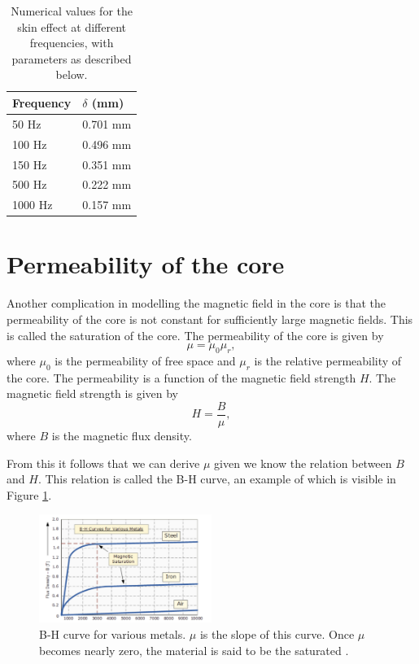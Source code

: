 \begin{table}
    \centering
    \begin{tabular}{l|l}
        Frequency & $\delta$ (mm) \\
        \hline
        50 Hz   & 0.701 mm \\
        100 Hz  & 0.496 mm \\
        150 Hz  & 0.351 mm \\
        500 Hz  & 0.222 mm \\
        1000 Hz & 0.157 mm \\
    \end{tabular}
    \caption{Numerical values for the skin effect at different frequencies, with parameters as described below.}
    \label{tab:skin_effect}
\end{table}


\section{Permeability of the core}
Another complication in modelling the magnetic field in the core is that the permeability of the core is not constant for sufficiently large magnetic fields.
This is called the saturation of the core. The permeability of the core is given by
\begin{equation}
    \mu = \mu_0 \mu_r,
\end{equation}
where $\mu_0$ is the permeability of free space and $\mu_r$ is the relative permeability of the core. The permeability is a function of the magnetic field strength $H$.
The magnetic field strength is given by
\begin{equation}
    H = \frac{B}{\mu},
\end{equation}
where $B$ is the magnetic flux density. 

From this it follows that we can derive $\mu$ given we know the relation between $B$ and $H$. 
This relation is called the B-H curve, an example of which is visible in Figure \ref{fig:bhcurve}.
\begin{figure}[H]
    \centering
    \includegraphics[width=0.5\textwidth]{img/BH_curve.png}
    \caption{B-H curve for various metals. $\mu$ is the slope of this curve. Once $\mu$ becomes nearly zero, the material is said 
    to be the saturated \cite{bhcurve}.}
    \label{fig:bhcurve}
\end{figure}

